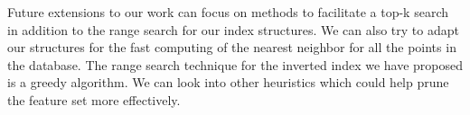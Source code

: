 Future extensions to our work can focus on methods to facilitate a top-k search in addition to the range search for our index structures. We can also try to adapt our structures for the fast computing of the nearest neighbor for all the points in the database. The range search technique for the inverted index we have proposed is a greedy algorithm. We can look into other heuristics which could help prune the feature set more effectively. \\

% 